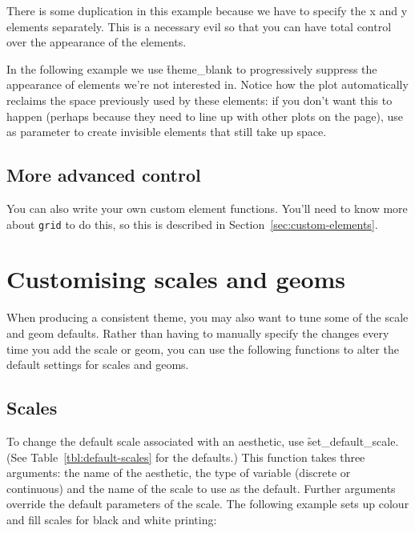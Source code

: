 There is some duplication in this example because we have to specify the x and y elements separately.  This is a necessary evil so that you can have total control over the appearance of the elements.

In the following example we use \f{theme_blank} to progressively suppress the appearance of elements we're not interested in.   Notice how the plot automatically reclaims the space previously used by these elements: if you don't want this to happen (perhaps because they need to line up with other plots on the page), use  as parameter to create invisible elements that still take up space.

% 


\subsection{More advanced control}
\label{sub:more_advanced_control}

You can also write your own custom element functions.  You'll need to know more about {\tt grid} to do this, so this is described in Section~\ref{sec:custom-elements}.

\section{Customising scales and geoms}
\label{sec:theme-scale-geom}

When producing a consistent theme, you may also want to tune some of the scale and geom defaults.  Rather than having to manually specify the changes every time you add the scale or geom, you can use the following functions to alter the default settings for scales and geoms.

\subsection{Scales}
\label{sub:customise-scales}

To change the default scale associated with an aesthetic, use \f{set_default_scale}. (See Table~\ref{tbl:default-scales} for the defaults.)  This function takes three arguments: the name of the aesthetic, the type of variable (discrete or continuous) and the name of the scale to use as the default.  Further arguments override the default parameters of the scale.  The following example sets up colour and fill scales for black and white printing:

